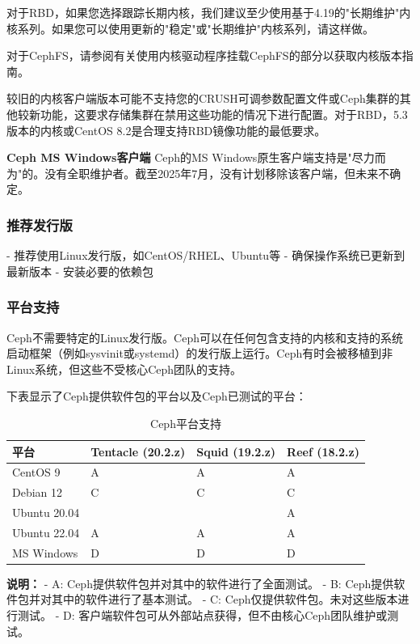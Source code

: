 \documentclass[12pt,UTF8]{ctexbook}
\begin{document}
对于RBD，如果您选择跟踪长期内核，我们建议至少使用基于4.19的"长期维护"内核系列。如果您可以使用更新的"稳定"或"长期维护"内核系列，请这样做。

对于CephFS，请参阅有关使用内核驱动程序挂载CephFS的部分以获取内核版本指南。

较旧的内核客户端版本可能不支持您的CRUSH可调参数配置文件或Ceph集群的其他较新功能，这要求存储集群在禁用这些功能的情况下进行配置。对于RBD，5.3版本的内核或CentOS 8.2是合理支持RBD镜像功能的最低要求。

\textbf{Ceph MS Windows客户端}
Ceph的MS Windows原生客户端支持是"尽力而为"的。没有全职维护者。截至2025年7月，没有计划移除该客户端，但未来不确定。

\subsubsection{推荐发行版}
- 推荐使用Linux发行版，如CentOS/RHEL、Ubuntu等
- 确保操作系统已更新到最新版本
- 安装必要的依赖包

\subsubsection{平台支持}
Ceph不需要特定的Linux发行版。Ceph可以在任何包含支持的内核和支持的系统启动框架（例如sysvinit或systemd）的发行版上运行。Ceph有时会被移植到非Linux系统，但这些不受核心Ceph团队的支持。

下表显示了Ceph提供软件包的平台以及Ceph已测试的平台：

\begin{table}[htbp]
\centering
\caption{Ceph平台支持}
\begin{tabular}{|l|l|l|l|}
\hline
\textbf{平台} & \textbf{Tentacle (20.2.z)} & \textbf{Squid (19.2.z)} & \textbf{Reef (18.2.z)} \\
\hline
CentOS 9 & A & A & A \\
Debian 12 & C & C & C \\
Ubuntu 20.04 &  &  & A \\
Ubuntu 22.04 & A & A & A \\
MS Windows & D & D & D \\
\hline
\end{tabular}
\end{table}

\textbf{说明：}
- A: Ceph提供软件包并对其中的软件进行了全面测试。
- B: Ceph提供软件包并对其中的软件进行了基本测试。
- C: Ceph仅提供软件包。未对这些版本进行测试。
- D: 客户端软件包可从外部站点获得，但不由核心Ceph团队维护或测试。
\end{document}
